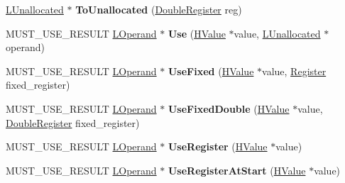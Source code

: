 \begin{DoxyCompactItemize}
\item 
\hyperlink{classv8_1_1internal_1_1_l_unallocated}{L\+Unallocated} $\ast$ {\bfseries To\+Unallocated} (\hyperlink{structv8_1_1internal_1_1_double_register}{Double\+Register} reg)\hypertarget{classv8_1_1internal_1_1_l_chunk_builder_a427a5c234ee24a3cf1c3036069908e31}{}\label{classv8_1_1internal_1_1_l_chunk_builder_a427a5c234ee24a3cf1c3036069908e31}

\item 
M\+U\+S\+T\+\_\+\+U\+S\+E\+\_\+\+R\+E\+S\+U\+LT \hyperlink{classv8_1_1internal_1_1_l_operand}{L\+Operand} $\ast$ {\bfseries Use} (\hyperlink{classv8_1_1internal_1_1_h_value}{H\+Value} $\ast$value, \hyperlink{classv8_1_1internal_1_1_l_unallocated}{L\+Unallocated} $\ast$operand)\hypertarget{classv8_1_1internal_1_1_l_chunk_builder_accd60b3b89817c5ad33a2124e268e793}{}\label{classv8_1_1internal_1_1_l_chunk_builder_accd60b3b89817c5ad33a2124e268e793}

\item 
M\+U\+S\+T\+\_\+\+U\+S\+E\+\_\+\+R\+E\+S\+U\+LT \hyperlink{classv8_1_1internal_1_1_l_operand}{L\+Operand} $\ast$ {\bfseries Use\+Fixed} (\hyperlink{classv8_1_1internal_1_1_h_value}{H\+Value} $\ast$value, \hyperlink{structv8_1_1internal_1_1_register}{Register} fixed\+\_\+register)\hypertarget{classv8_1_1internal_1_1_l_chunk_builder_a61be80f9ab32bd10c228aad8844f63b7}{}\label{classv8_1_1internal_1_1_l_chunk_builder_a61be80f9ab32bd10c228aad8844f63b7}

\item 
M\+U\+S\+T\+\_\+\+U\+S\+E\+\_\+\+R\+E\+S\+U\+LT \hyperlink{classv8_1_1internal_1_1_l_operand}{L\+Operand} $\ast$ {\bfseries Use\+Fixed\+Double} (\hyperlink{classv8_1_1internal_1_1_h_value}{H\+Value} $\ast$value, \hyperlink{structv8_1_1internal_1_1_double_register}{Double\+Register} fixed\+\_\+register)\hypertarget{classv8_1_1internal_1_1_l_chunk_builder_a30223bb99ad69217597b53afef85c6c1}{}\label{classv8_1_1internal_1_1_l_chunk_builder_a30223bb99ad69217597b53afef85c6c1}

\item 
M\+U\+S\+T\+\_\+\+U\+S\+E\+\_\+\+R\+E\+S\+U\+LT \hyperlink{classv8_1_1internal_1_1_l_operand}{L\+Operand} $\ast$ {\bfseries Use\+Register} (\hyperlink{classv8_1_1internal_1_1_h_value}{H\+Value} $\ast$value)\hypertarget{classv8_1_1internal_1_1_l_chunk_builder_a71d4b11b7eca26df2551720af10eeb8d}{}\label{classv8_1_1internal_1_1_l_chunk_builder_a71d4b11b7eca26df2551720af10eeb8d}

\item 
M\+U\+S\+T\+\_\+\+U\+S\+E\+\_\+\+R\+E\+S\+U\+LT \hyperlink{classv8_1_1internal_1_1_l_operand}{L\+Operand} $\ast$ {\bfseries Use\+Register\+At\+Start} (\hyperlink{classv8_1_1internal_1_1_h_value}{H\+Value} $\ast$value)\hypertarget{classv8_1_1internal_1_1_l_chunk_builder_af42aa233d6d4e068d8c2f2b4fa82c4da}{}\label{classv8_1_1internal_1_1_l_chunk_builder_af42aa233d6d4e068d8c2f2b4fa82c4da}


\end{DoxyCompactItemize}
